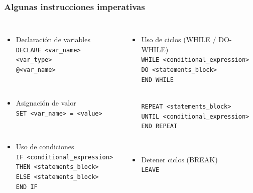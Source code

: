 \documentclass[
	10pt, %
	aspectratio=169, %
]{beamer}
\begin{document}

\begin{frame}[fragile]
	
	\frametitle{Algunas instrucciones imperativas}
	
	\begin{columns}[t]
		
			\begin{itemize}
			
			\item Declaración de variables \\
			\texttt{\textcolor{codepurple}{DECLARE} <var\_name> <var\_type>} \\ 
			\texttt{\textcolor{codepurple}{@}<var\_name>}
			
			\pause
			\ 
			
			\item  Asignación de valor \\ 
			\texttt{\textcolor{codepurple}{SET} <var\_name> = <value>}
			
			\pause
			\ 
			
			\item  Uso de condiciones \\
			\texttt{\textcolor{codepurple}{IF} <conditional\_expression> \\ 
				\textcolor{codepurple}{THEN} <statements\_block> \\ 
				\textcolor{codepurple}{ELSE} <statements\_block> \\ 
				\textcolor{codepurple}{END IF}}
			
		\end{itemize}
		
		
			\begin{itemize}
				
			\pause 
						
			\item Uso de ciclos (WHILE / DO-WHILE)\\
			\texttt{\textcolor{codepurple}{WHILE}  <conditional\_expression>  \\
			\textcolor{codepurple}{DO}  <statements\_block> \\
			\textcolor{codepurple}{END WHILE}} \\
			
			\ 
			
			\texttt{\textcolor{codepurple}{REPEAT}  <statements\_block>  \\
			\textcolor{codepurple}{UNTIL} <conditional\_expression> \\
			\textcolor{codepurple}{END REPEAT}}
			
			\pause
			\ 
			
			\item Detener ciclos (BREAK)\\ 
			\texttt{\textcolor{codepurple}{LEAVE}}
			
		\end{itemize}
		
	\end{columns}
	
\end{frame}
\end{document}
